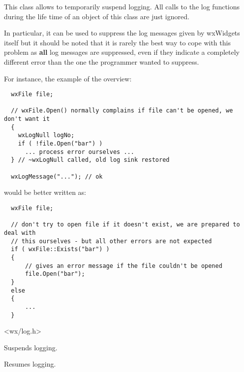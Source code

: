 This class allows to temporarily suspend logging. All calls to the log
functions during the life time of an object of this class are just ignored.

In particular, it can be used to suppress the log messages given by wxWidgets
itself but it should be noted that it is rarely the best way to cope with this
problem as {\bf all} log messages are suppressed, even if they indicate a
completely different error than the one the programmer wanted to suppress.

For instance, the example of the overview:

{\small
\begin{verbatim}
  wxFile file;

  // wxFile.Open() normally complains if file can't be opened, we don't want it
  {
    wxLogNull logNo;
    if ( !file.Open("bar") )
      ... process error ourselves ...
  } // ~wxLogNull called, old log sink restored

  wxLogMessage("..."); // ok
\end{verbatim}
}%

would be better written as:

{\small
\begin{verbatim}
  wxFile file;

  // don't try to open file if it doesn't exist, we are prepared to deal with
  // this ourselves - but all other errors are not expected
  if ( wxFile::Exists("bar") )
  {
      // gives an error message if the file couldn't be opened
      file.Open("bar");
  }
  else
  {
      ...
  }
\end{verbatim}
}%




<wx/log.h>


\label{wxlognullctor}


Suspends logging.

\label{wxlognulldtor}

Resumes logging.


\section{}\label{wxlogpassthrough}

